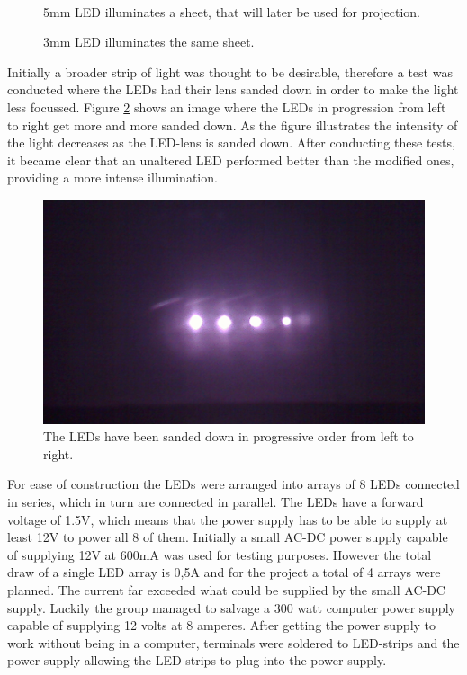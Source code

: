 \begin{figure}[htbp]
\begin{minipage}[b]{0.45\textwidth}
\end{minipage} \\ %
\begin{minipage}[t]{0.45\textwidth}
\caption{5mm LED illuminates a sheet, that will later be used for projection.} %
\label{fig:5_mm_test}
\end{minipage} \hfill
\begin{minipage}[t]{0.45\textwidth}
\caption{3mm LED illuminates the same sheet.} %
\label{fig:3_mm_led}
\end{minipage}
\end{figure}

Initially a broader strip of light was thought to be desirable, therefore a test was conducted where the LEDs had their lens sanded down in order to make the light less focussed. Figure \ref{fig:leds_sanded} shows an image where the LEDs in progression from left to right get more and more sanded down. As the figure illustrates the intensity of the light decreases as the LED-lens is sanded down. After conducting these tests,  it became clear that an unaltered LED performed better than the modified ones, providing a more intense illumination.

\begin{figure} [htbp]
\centering
\includegraphics[width=1.00\textwidth]{Pictures/Theory/sanded_leds.jpg}
\caption{The LEDs have been sanded down in progressive order from left to right.}
\label{fig:leds_sanded}
\end{figure}

For ease of construction the LEDs were arranged into arrays of 8 LEDs connected in series, which in turn are connected in parallel. The LEDs have a forward voltage of 1.5V, which means that the power supply has to be able to supply at least 12V to power all 8 of them. Initially a small AC-DC power supply capable of supplying 12V at 600mA was used for testing purposes. However the total draw of a single LED array is 0,5A and for the project a total of 4 arrays were planned. The current far exceeded what could be supplied by the small AC-DC supply. Luckily the group managed to salvage a 300 watt computer power supply capable of supplying 12 volts at 8 amperes. After getting the power supply to work without being in a computer, terminals were soldered to LED-strips and the power supply allowing the LED-strips to plug into the power supply.

